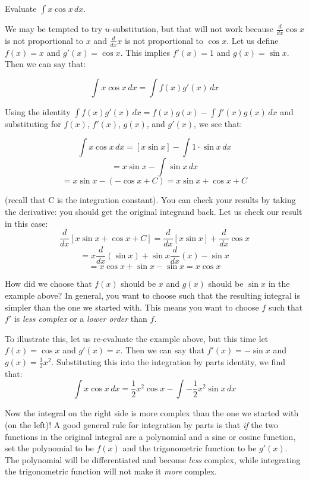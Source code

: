 \begin{Worked}
\begin{Problem}
Evaluate $\int x \cos{x} \,dx$.
\end{Problem}
\begin{Solution}
We may be tempted to try $u$-substitution, but that will not 
work because $\frac{d}{dx} \cos{x}$ is not proportional to $x$ and $\frac{d}{dx} 
x$ is not proportional to $\cos{x}$. Let us define $f(x) = x$ and $g'(x) = 
\cos{x}$. This implies $f'(x) = 1$ and $g(x) = \sin{x}$. Then we can say that:

$$\int x \cos{x} \,dx = \int f(x)g'(x)\,dx$$

Using the identity $\int f(x)g'(x)\,dx = f(x)g(x) - \int f'(x)g(x)\,dx$ and 
substituting for $f(x)$, $f'(x)$, $g(x)$, and $g'(x)$, we see that:

$$\int x \cos{x} \,dx = \left[ x \sin{x} \right] - \int 1 \cdot \sin{x}\,dx$$
$$= x \sin{x} - \int \sin{x}\,dx$$
$$= x \sin{x} - \left( -\cos{x}  + C \right) = x \sin{x} + \cos{x} + C$$

(recall that C is the integration constant). You can check your results by 
taking the derivative: you should get the original integrand back. Let us check 
our result in this case:
$$\frac{d}{dx} \left[ x \sin{x} + \cos{x} + C \right] = \frac{d}{dx} \left[x 
\sin{x} \right] + \frac{d}{dx} \cos{x}$$
$$= x \frac{d}{dx} \left( \sin{x} \right) + \sin{x} \frac{d}{dx} (x) - \sin{x}$$
$$= x \cos{x} +\sin{x} - \sin{x} = x \cos{x}$$
\end{Solution}
\end{Worked}

How did we choose that $f(x)$ should be $x$ and $g(x)$ should be $\sin{x}$ in 
the example above? In general, you want to choose such that the resulting 
integral is simpler than the one we started with. This means you want to choose 
$f$ such that $f'$ is \textit{less complex} or a \textit{lower order} than $f$. 

To illustrate this, let us re-evaluate the example above, but this time let $f(x) 
= \cos{x}$ and $g'(x) = x$. Then we can say that $f'(x) = -\sin{x}$ and $g(x) 
= \frac{1}{2}x^2$. Substituting this into the integration by parts identity, 
we find that:
$$\int x \cos{x} \,dx = \frac{1}{2}x^2 \cos{x} - \int -\frac{1}{2}x^2 \sin{x}\,dx$$

Now the integral on the right side is more complex than the one we started 
with (on the left)! A good general rule for integration by parts is that 
\textit{if} the two functions in the original integral are a polynomial and a 
sine or cosine function, set the polynomial to be $f(x)$ and the trigonometric 
function to be $g'(x)$. The polynomial will be differentiated and become 
\textit{less} complex, while integrating the trigonometric function will not make 
it \textit{more} complex. 

